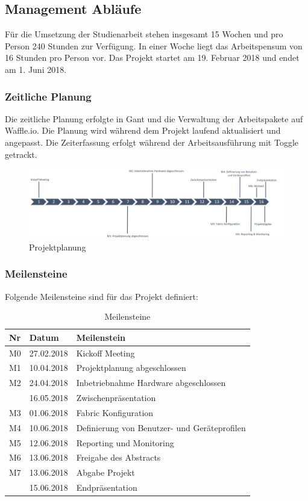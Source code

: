 \subsection{Management Abläufe}
Für die Umsetzung der Studienarbeit stehen insgesamt 15 Wochen und pro Person 240 Stunden zur Verfügung. In einer Woche liegt das Arbeitspensum von 16 Stunden pro Person vor. Das Projekt startet am 19. Februar 2018 und endet am 1. Juni 2018.

\subsubsection{Zeitliche Planung}
Die zeitliche Planung erfolgte in Gant und die Verwaltung der Arbeitspakete auf Waffle.io. Die Planung wird während dem Projekt laufend aktualisiert und angepasst. Die Zeiterfassung erfolgt während der Arbeitsausführung mit Toggle getrackt.

\begin{figure}[H]
	\centering
	\includegraphics[width=16cm]{img/ZeitlichePlanung_v4.png}
	\caption{Projektplanung}
	\label{fig:Projektplanung}
\end{figure} 

\subsubsection{Meilensteine}
Folgende Meilensteine sind für das Projekt definiert:
\begin{table}[H]
	\centering
	\begin{tabularx}{\textwidth}{p{1cm}| p{2.5cm}| X}
		\rowcolor{gray!50}
		\textbf{Nr} & \textbf{Datum} & \textbf{Meilenstein} \\
		\hline	
		M0 & 27.02.2018 & Kickoff Meeting \\
		M1 & 10.04.2018 & Projektplanung abgeschlossen \\
		M2 & 24.04.2018 & Inbetriebnahme Hardware abgeschlossen \\
		& 16.05.2018 & Zwischenpräsentation \\
		M3 & 01.06.2018 & Fabric Konfiguration \\
		M4 & 10.06.2018 & Definierung von Benutzer- und Geräteprofilen \\
		M5 & 12.06.2018 & Reporting und Monitoring \\
		M6 & 13.06.2018 & Freigabe des Abstracts \\
		M7 & 13.06.2018 & Abgabe Projekt \\
		& 15.06.2018 & Endpräsentation \\
	\end{tabularx}
	\caption{Meilensteine}
	\label{tab:Meilensteine}
\end{table}


